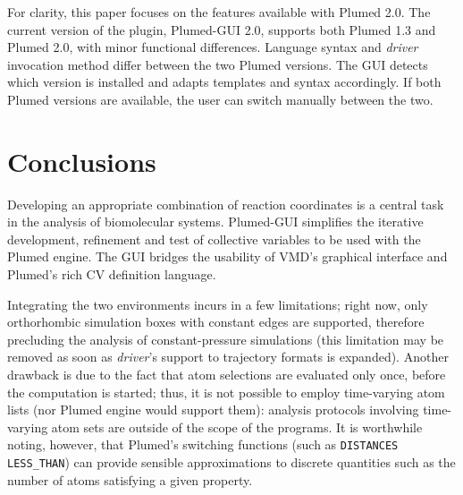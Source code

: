 \documentclass[preprint,review,11pt]{elsarticle}
\begin{document}
For clarity, this paper focuses on the features available with Plumed
2.0. The current version of the plugin, Plumed-GUI 2.0, supports both
Plumed 1.3 and Plumed 2.0, with minor functional differences.
Language syntax and \emph{driver} invocation method differ between the
two Plumed versions.  The GUI detects which version is installed and
adapts templates and syntax accordingly.  If both Plumed versions are
available, the user can switch manually between the two.

















\section{Conclusions}

Developing an appropriate combination of reaction coordinates is a
central task in the analysis of biomolecular systems.  Plumed-GUI
simplifies the iterative development, refinement and test of
collective variables to be used with the Plumed engine.  The GUI
bridges the usability of VMD's graphical interface and Plumed's rich
CV definition language.  

Integrating the two environments incurs in a few limitations; right
now, only orthorhombic simulation boxes with constant edges are
supported, therefore precluding the analysis of constant-pressure
simulations (this limitation may be removed as soon as \emph{driver}'s
support to trajectory formats is expanded). Another drawback is due to
the fact that atom selections are evaluated only once, before the
computation is started; thus, it is not possible to employ
time-varying atom lists (nor Plumed engine would support them):
analysis protocols involving time-varying atom sets are outside of the
scope of the programs. It is worthwhile noting, however, that Plumed's
switching functions (such as \texttt{DISTANCES LESS\_THAN}) can
provide sensible approximations to discrete quantities such as the
number of atoms satisfying a given property.
\end{document}
